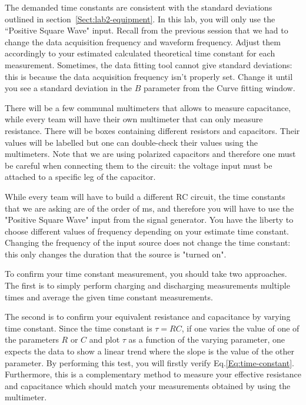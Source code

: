\documentclass[12pt]{report}
\begin{document}
The demanded time constants are consistent with the standard deviations outlined in section~\ref{Sect:lab2-equipment}. In this lab, you will only use the ``Positive Square Wave" input. Recall from the previous session that we had to change the data acquisition frequency and waveform frequency. Adjust them accordingly to your estimated calculated theoretical time constant for each measurement. Sometimes, the data fitting tool cannot give standard deviations: this is because the data acquisition frequency isn't properly set. Change it until you see a standard deviation in the $B$ parameter from the Curve fitting window.

There will be a few communal multimeters that allows to measure capacitance, while every team will have their own multimeter that can only measure resistance. There will be boxes containing different resistors and capacitors. Their values will be labelled but one can double-check their values using the multimeters. Note that we are using polarized capacitors and therefore one must be careful when connecting them to the circuit: the voltage input must be attached to a specific leg of the capacitor.

While every team will have to build a different RC circuit, the time constants that we are asking are of the order of ms, and therefore you will have to use the "Positive Square Wave" input from the signal generator. You have the liberty to choose different values of frequency depending on your estimate time constant. Changing the frequency of the input source does not change the time constant: this only changes the duration that the source is "turned on".

To confirm your time constant measurement, you should take two approaches. The first is to simply perform charging and discharging measurements multiple times and average the given time constant measurements.

The second is to confirm your equivalent resistance and capacitance by varying time constant. Since the time constant is $\tau = RC$, if one varies the value of one of the parameters $R$ or $C$ and plot $\tau$ as a function of the varying parameter, one expects the data to show a linear trend where the slope is the value of the other parameter. By performing this test, you will firstly verify Eq.\eqref{Eq:time-constant}. Furthermore, this is a complementary method to measure your effective resistance and capacitance which should match your measurements obtained by using the multimeter.
\end{document}
